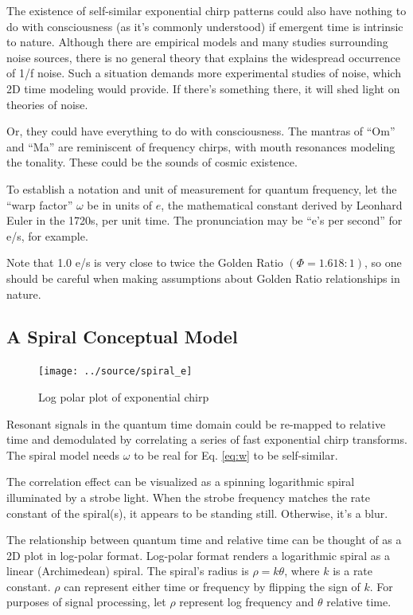 The existence of self-similar exponential chirp patterns could also have nothing
to do with consciousness (as it's commonly understood) if emergent time is
intrinsic to nature.
Although there are empirical models and many studies surrounding noise sources,
there is no general theory that explains the widespread occurrence of 1/f noise.
Such a situation demands more experimental studies of noise, which 2D time modeling
would provide. If there's something there, it will shed light on theories of noise.

Or, they could have everything to do with consciousness.
The mantras of ``Om'' and ``Ma'' are reminiscent of frequency chirps,
with mouth resonances modeling the tonality.
These could be the sounds of cosmic existence.

To establish a notation and unit of measurement for quantum frequency,
let the ``warp factor'' $\omega$ be in units of $e$, the
mathematical constant derived by Leonhard Euler in the 1720s, per unit time.
The pronunciation may be ``e's per second'' for e/s, for example.

Note that 1.0 e/s is very close to twice the Golden Ratio $(\Phi=1.618:1)$,
so one should be careful when making assumptions about Golden Ratio relationships
in nature.

\subsection{A Spiral Conceptual Model}

\begin{figure}[h]
    \centering
    \texttt{[image: ../source/spiral\_e]}
    \caption[Quantum to Relative Time Relation]{Log polar plot of exponential chirp}
    \label{fig:spiral}
\end{figure}

Resonant signals in the quantum time domain could be re-mapped to relative time
and demodulated by correlating a series of fast exponential chirp transforms. 
The spiral model needs $\omega$ to be real for Eq. \ref{eq:w} to be self-similar.

The correlation effect can be visualized as a spinning logarithmic spiral
illuminated by a strobe light. When the strobe frequency matches the rate
constant of the spiral(s), it appears to be standing still.
Otherwise, it's a blur.

The relationship between quantum time and relative time can be thought of as a
2D plot in log-polar format.
Log-polar format renders a logarithmic spiral as a linear (Archimedean) spiral.
The spiral's radius is $\rho = k\theta$, where $k$ is a rate constant.
$\rho$ can represent either time or frequency by flipping the sign of $k$.
For purposes of signal processing, let $\rho$ represent log frequency and
$\theta$ relative time.


